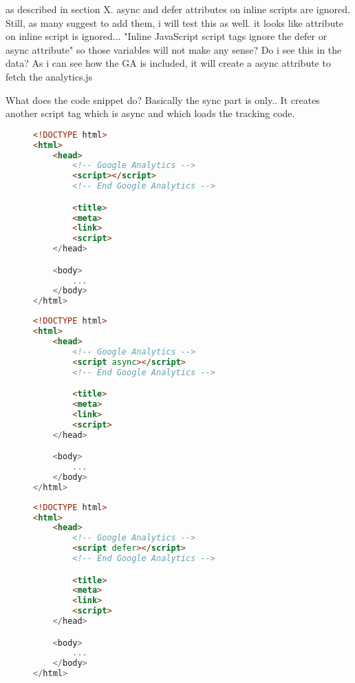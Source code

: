 as described in section X. async and defer attributes on inline scripts are ignored.
Still, as many suggest to add them, i will test this as well.
it looks like attribute on inline script is ignored... "Inline JavaScript script tags ignore the defer or async attribute"
so those variables will not make any sense? Do i see this in the data?
As i can see how the GA is included, it will create a async attribute to fetch the analytics.js


What does the code snippet do?
Basically the sync part is only..
It creates another script tag which is async and which loads the tracking code.


\begin{sidewaysfigure}

\begin{multicols}{3}

\begin{center}
\begin{lstlisting}[caption={Attribute 1}, language=html, numbers=none]
<!DOCTYPE html>
<html>
    <head>
        <!-- Google Analytics -->
        <script></script>
        <!-- End Google Analytics -->

        <title>
        <meta>
        <link>
        <script>
    </head>

    <body>
        ...
    </body>
</html>
\end{lstlisting}
\end{center}

\columnbreak

\begin{center}
\begin{lstlisting}[caption={Attribute 2}, language=html, numbers=none]
<!DOCTYPE html>
<html>
    <head>
        <!-- Google Analytics -->
        <script async></script>
        <!-- End Google Analytics -->

        <title>
        <meta>
        <link>
        <script>
    </head>

    <body>
        ...
    </body>
</html>
\end{lstlisting}
\end{center}

\columnbreak

\begin{center}
\begin{lstlisting}[caption={Attribute 3}, language=html, numbers=none]
<!DOCTYPE html>
<html>
    <head>
        <!-- Google Analytics -->
        <script defer></script>
        <!-- End Google Analytics -->

        <title>
        <meta>
        <link>
        <script>
    </head>

    <body>
        ...
    </body>
</html>
\end{lstlisting}
\end{center}

\end{multicols}

\end{sidewaysfigure}



